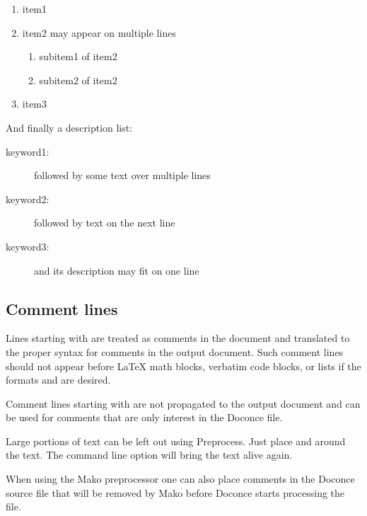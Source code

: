 \documentclass[%
oneside,                 %
final,                   %
10pt]{article}
\begin{document}
\begin{enumerate}
\item item1

\item item2
   may appear on
   multiple lines
\begin{enumerate}

 \item subitem1 of item2

 \item subitem2 of item2

\end{enumerate}

\noindent
\item item3
\end{enumerate}

\noindent
And finally a description list:

\begin{description}
 \item[keyword1:] 
   followed by
   some text
   over multiple
   lines

 \item[keyword2:] 
   followed by text on the next line

 \item[keyword3:] 
   and its description may fit on one line
\end{description}

\noindent
\subsection{Comment lines}

Lines starting with \code{#} are treated as comments in the document and
translated to the proper syntax for comments in the output
document. Such comment lines should not appear before {\LaTeX} math
blocks, verbatim code blocks, or lists if the formats  and
 are desired.

Comment lines starting with \code{##} are not propagated to the output
document and can be used for comments that are only interest in
the Doconce file.

Large portions of text can be left out using Preprocess. Just place
 and  around the text. The command line
option  will bring the text alive again.

When using the Mako preprocessor one can also place comments in
the Doconce source file that will be removed by Mako before
Doconce starts processing the file.
\end{document}
